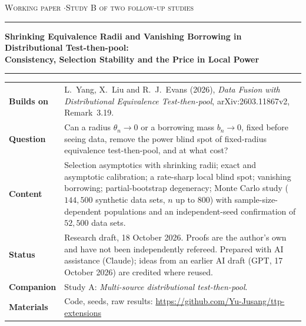 \documentclass[11pt,a4paper]{article}
\begin{document}
\begin{titlepage}
\vspace*{20mm}
{\small\textsc{Working paper \quad$\cdot$\quad Study B of two follow-up studies}}\par
\vspace{6mm}
\rule{\textwidth}{0.6pt}\par\vspace{5mm}
{\LARGE\bfseries Shrinking Equivalence Radii and Vanishing Borrowing in Distributional Test-then-pool:\\[2mm] Consistency, Selection Stability and the Price in Local Power\par}
\vspace{5mm}\rule{\textwidth}{0.6pt}\par
\vspace{10mm}
\begin{tabularx}{\textwidth}{@{}lX@{}}
\textbf{Builds on} & L.~Yang, X.~Liu and R.~J.~Evans (2026), \emph{Data Fusion with Distributional Equivalence Test-then-pool}, arXiv:2603.11867v2, Remark~3.19. \\[1mm]
\textbf{Question} & Can a radius $\theta_n\to0$ or a borrowing mass $b_n\to0$, fixed before seeing data, remove the power blind spot of fixed-radius equivalence test-then-pool, and at what cost? \\[1mm]
\textbf{Content} & Selection asymptotics with shrinking radii; exact and asymptotic calibration; a rate-sharp local blind spot; vanishing borrowing; partial-bootstrap degeneracy; Monte Carlo study ($144{,}500$ synthetic data sets, $n$ up to $800$) with sample-size-dependent populations and an independent-seed confirmation of $52{,}500$ data sets. \\[1mm]
\textbf{Status} & Research draft, 18 October 2026. Proofs are the author's own and have not been independently refereed. Prepared with AI assistance (Claude); ideas from an earlier AI draft (GPT, 17 October 2026) are credited where reused. \\[1mm]
\textbf{Companion} & Study A: \emph{Multi-source distributional test-then-pool}. \\[1mm]
\textbf{Materials} & Code, seeds, raw results: \url{https://github.com/Yu-Jusang/ttp-extensions}
\end{tabularx}
\vfill
\end{titlepage}
\end{document}
